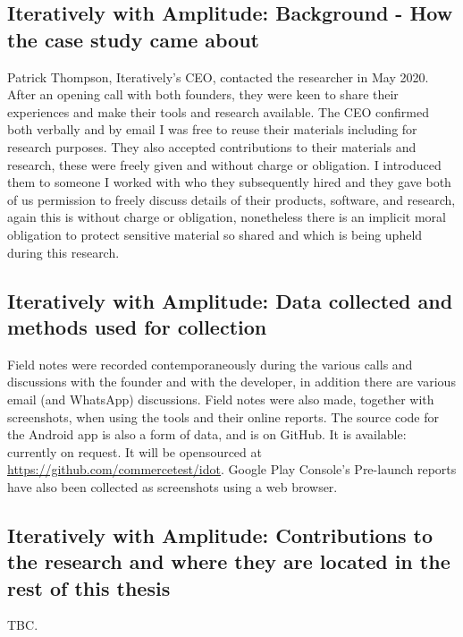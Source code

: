 \subsection{Iteratively with Amplitude: Background - How the case study came about}
Patrick Thompson, Iteratively's CEO, contacted the researcher in May 2020. After an opening call with both founders, they were keen to share their experiences and make their tools and research available. The CEO confirmed both verbally and by email I was free to reuse their materials including for research purposes. They also accepted contributions to their materials and research, these were freely given and without charge or obligation. I introduced them to someone I worked with who they subsequently hired and they gave both of us permission to freely discuss details of their products, software, and research, again this is without charge or obligation, nonetheless there is an implicit moral obligation to protect sensitive material so shared and which is being upheld during this research.

\subsection{Iteratively with Amplitude: Data collected and methods used for collection}
Field notes were recorded contemporaneously during the various calls and discussions with the founder and with the developer, in addition there are various email (and WhatsApp) discussions. Field notes were also made, together with screenshots, when using the tools and their online reports. The source code for the Android app is also a form of data, and is on GitHub. It is available: currently on request. It will be opensourced at \url{https://github.com/commercetest/idot}. Google Play Console's Pre-launch reports have also been collected as screenshots using a web browser.

\subsection{Iteratively with Amplitude: Contributions to the research and where they are located in the rest of this thesis}
TBC.





